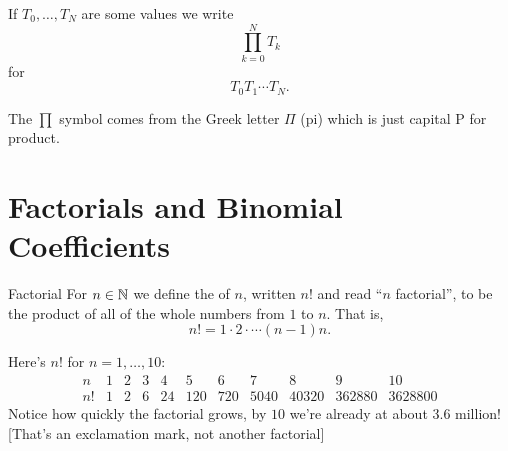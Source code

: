 \documentclass[fleqn]{LectureClass/LectureClass}
\begin{document}
    \begin{ntn}{}{}
        If \(T_0, \dotsc, T_N\) are some values we write
        \begin{equation}
            \prod_{k=0}^N T_k
        \end{equation}
        for
        \begin{equation}
            T_0 T_1 \dotsm T_N.
        \end{equation}
    \end{ntn}
    
    \begin{remark}{}{}
        The \(\prod\) symbol comes from the Greek letter \(\Pi\) (pi) which is just capital P for product.
    \end{remark}
    
    \section{Factorials and Binomial Coefficients}
    \begin{dfn}{Factorial}{}
        For \(n \in \mathbb{N}\) we define the  of \(n\), written \(n!\) and read \enquote{\(n\) factorial}, to be the product of all of the whole numbers from \(1\) to \(n\).
        That is,
        \begin{equation}
            n! = 1 \cdot 2 \cdot \dotsb (n - 1) n.
        \end{equation}
    \end{dfn}
    
    \begin{exm}{}{}
        Here's \(n!\) for \(n = 1, \dotsc, 10\):
        \begin{equation*}
            \begin{array}{r|rrrrrrrrrr}
                n & 1 & 2 & 3 & 4 & 5 & 6 & 7 & 8 & 9 & 10 \\ \hline
                n! & 1 & 2 & 6 & 24 & 120 & 720 & 5040 & 40320 & 362880 & 3628800
            \end{array}
        \end{equation*}
        Notice how quickly the factorial grows, by \(10\) we're already at about 3.6 million! [That's an exclamation mark, not another factorial]
    \end{exm}
    
\end{document}
